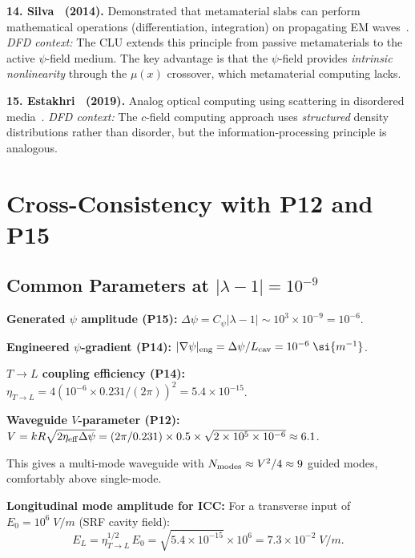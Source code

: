 \documentclass[aps,prd,twocolumn,superscriptaddress,nofootinbib,floatfix]{revtex4-2}
\newcommand{\ee}[1]{\times 10^{#1}}
\begin{document}
\textbf{14. Silva \etal\ (2014).} Demonstrated that metamaterial
slabs can perform mathematical operations (differentiation,
integration) on propagating EM waves~\cite{Silva2014}.
\textit{DFD context:} The CLU extends this principle from
passive metamaterials to the active $\psi$-field medium.
The key advantage is that the $\psi$-field provides
\emph{intrinsic nonlinearity} through the $\mu(x)$ crossover,
which metamaterial computing lacks.

\textbf{15. Estakhri \etal\ (2019).} Analog optical computing
using scattering in disordered media~\cite{Estakhri2019}.
\textit{DFD context:} The $c$-field computing approach uses
\emph{structured} density distributions rather than disorder,
but the information-processing principle is analogous.

\section{Cross-Consistency with P12 and P15}
\label{sec:consistency}

\subsection{Common Parameters at $|\lambda-1| = 10^{-9}$}

\textbf{Generated $\psi$ amplitude (P15):}
$\Delta\psi = C_\psi|\lambda-1| \sim 10^3 \times 10^{-9} = 10^{-6}$.

\textbf{Engineered $\psi$-gradient (P14):}
$|\nabla\psi|_{\rm eng} = \Delta\psi/L_{\rm cav} = 10^{-6}\;\si{m^{-1}}$.

\textbf{$T\to L$ coupling efficiency (P14):}
$\eta_{T\to L} = 4(10^{-6}\times0.231/(2\pi))^2 = 5.4\ee{-15}$.

\textbf{Waveguide $V$-parameter (P12):}
$V = kR\sqrt{2\eta_{\rm eff}\Delta\psi} = (2\pi/0.231)\times0.5\times\sqrt{2\times10^5\times10^{-6}} \approx 6.1$.

This gives a multi-mode waveguide with $N_{\rm modes} \approx V^2/4 \approx 9$
guided modes, comfortably above single-mode.

\textbf{Longitudinal mode amplitude for ICC:}
For a transverse input of $E_0 = 10^6\;\si{V/m}$ (SRF cavity field):
\begin{equation}
E_L = \eta_{T\to L}^{1/2}\,E_0 = \sqrt{5.4\ee{-15}}\times10^6 = 7.3\ee{-2}\;\si{V/m}.
\end{equation}
\end{document}
